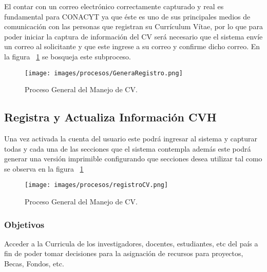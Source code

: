El contar con un correo electrónico correctamente capturado y real es fundamental para CONACYT ya que éste es uno de sus principales medios de comunicación con las personas que registran su Currículum Vítae, por lo que para poder iniciar la captura de información del CV será necesario que el sistema envíe un correo al solicitante y que este ingrese a su correo y confirme dicho correo. En la figura ~\ref{fig:GeneraRegistro} se bosqueja este subproceso. \\

\begin{figure}[htbp]
  \begin{center}
    \texttt{[image: images/procesos/GeneraRegistro.png]}
    \caption{Proceso General del Manejo de CV.}
    \label{fig:GeneraRegistro}
  \end{center}
\end{figure}
\subsection{Registra y Actualiza Información CVH}

Una vez activada la cuenta del usuario este podrá ingresar al sistema y capturar todas y cada una de las secciones que el sistema contempla además este podrá generar una versión imprimible configurando que secciones desea utilizar tal como se observa en la figura ~\ref{fig:GeneraRegistro}

\begin{figure}[htbp]
  \begin{center}
    \texttt{[image: images/procesos/registroCV.png]}
    \caption{Proceso General del Manejo de CV.}
    \label{fig:registroCV}
  \end{center}
\end{figure}



\subsubsection{Objetivos}

	Acceder a la Curricula de los investigadores, docentes, estudiantes, etc del país a fin de poder tomar decisiones para la asignación de recursos para proyectos, Becas, Fondos, etc.



